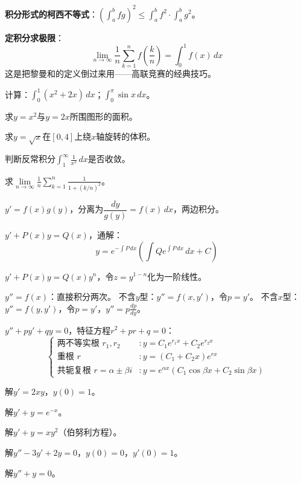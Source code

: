 \documentclass[a4paper,12pt]{ctexart}
\begin{document}

\textbf{积分形式的柯西不等式}：$\left(\int_a^b fg\right)^2 \le \int_a^b f^2\cdot\int_a^b g^2$。

\textbf{定积分求极限}：
\[
\lim_{n\to\infty}\frac1n\sum_{k=1}^n f\left(\frac{k}{n}\right) = \int_0^1 f(x)\,dx
\]
这是把黎曼和的定义倒过来用——高联竞赛的经典技巧。


\begin{exercise}
\item 计算：$\int_0^1 (x^2+2x)\,dx$；$\int_0^\pi\sin x\,dx$。
\item 求$y=x^2$与$y=2x$所围图形的面积。
\item 求$y=\sqrt{x}$在$[0,4]$上绕$x$轴旋转的体积。
\item 判断反常积分$\int_1^\infty\frac1{x^2}\,dx$是否收敛。
\item 求$\lim\limits_{n\to\infty}\frac1n\sum_{k=1}^n\frac1{1+(k/n)^2}$。
\end{exercise}

\newpage



$y' = f(x)g(y)$，分离为$\dfrac{dy}{g(y)}=f(x)\,dx$，两边积分。


$y'+P(x)y=Q(x)$，通解：
\[
y = e^{-\int P\,dx}\left(\int Q e^{\int P\,dx}\,dx + C\right)
\]


$y'+P(x)y=Q(x)y^n$，令$z=y^{1-n}$化为一阶线性。


$y''=f(x)$：直接积分两次。
不含$y$型：$y''=f(x,y')$，令$p=y'$。
不含$x$型：$y''=f(y,y')$，令$p=y'$，$y''=p\frac{dp}{dy}$。


$y''+py'+qy=0$，特征方程$r^2+pr+q=0$：
\[
\begin{cases}
\text{两不等实根 }r_1,r_2 &: y=C_1e^{r_1x}+C_2e^{r_2x}\\
\text{重根 }r &: y=(C_1+C_2x)e^{rx}\\
\text{共轭复根 }r=\alpha\pm\beta i &: y=e^{\alpha x}(C_1\cos\beta x+C_2\sin\beta x)
\end{cases}
\]


\begin{exercise}
\item 解$y'=2xy$，$y(0)=1$。
\item 解$y'+y=e^{-x}$。
\item 解$y'+y=xy^2$（伯努利方程）。
\item 解$y''-3y'+2y=0$，$y(0)=0$，$y'(0)=1$。
\item 解$y''+y=0$。
\end{exercise}
\end{document}
